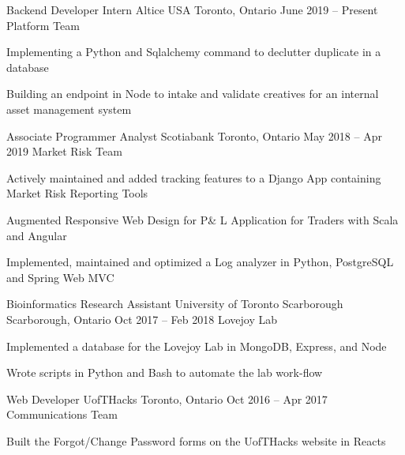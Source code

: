 \begin{cventries}
  \cventry
    {Backend Developer Intern}
    {Altice USA}
    {Toronto, Ontario}
    {June 2019 -- Present}
    {Platform Team}
    {
    \begin{cvitems}
      \item {Implementing a Python and Sqlalchemy command to declutter duplicate in a database}
      \item {Building an endpoint in Node to intake and validate creatives for an internal asset management system}
    \end{cvitems}
    }
  \cventry
    {Associate Programmer Analyst}
    {Scotiabank}
    {Toronto, Ontario}
    {May 2018 -- Apr 2019}
    {Market Risk Team}
    {
      \begin{cvitems}
        \item {Actively maintained and added tracking features to a Django App containing Market Risk Reporting Tools}
        \item {Augmented Responsive Web Design for P\& L Application for Traders with Scala and Angular}
        \item {Implemented, maintained and optimized a Log analyzer in Python, PostgreSQL and Spring Web MVC}
      \end{cvitems}
    }

  \cventry
    {Bioinformatics Research Assistant}
    {University of Toronto Scarborough}
    {Scarborough, Ontario}
    {Oct 2017 -- Feb 2018}
    {Lovejoy Lab}
    {
      \begin{cvitems}
        \item {Implemented a database for the Lovejoy Lab in MongoDB, Express, and Node}
        \item {Wrote scripts in Python and Bash to automate the lab work-flow}
      \end{cvitems}
    }
    \cventry
    {Web Developer}
    {UofTHacks}
    {Toronto, Ontario}
    {Oct 2016 -- Apr 2017}
    {Communications Team}
    {
      \begin{cvitems}
        \item {Built the Forgot/Change Password forms on the UofTHacks website in Reacts}
      \end{cvitems}
    }
\end{cventries}
